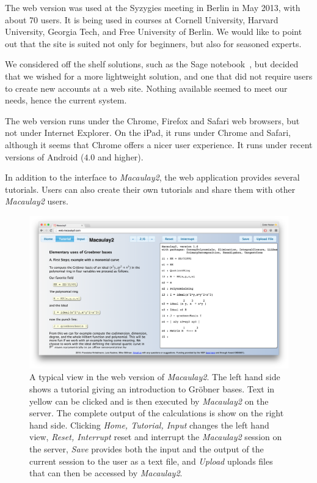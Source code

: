 \documentclass[twocolumn]{article}
\def\M2{{\it Macaulay2}}
\begin{document}
 The web version was used at the Syzygies
meeting in Berlin in May 2013, with about 70 users. It is being used in courses at Cornell
University, Harvard University, Georgia Tech, and Free University of
 Berlin. We would like to point out that the
site is suited not only for beginners, but also for seasoned experts.

We considered off the shelf solutions, such as the Sage
notebook~\cite{sagenotebook}, but decided that we wished for a more
lightweight solution, and one that did not require users to create
new accounts at a web site.  Nothing available seemed to meet our
needs, hence the current system.

The web version runs under the Chrome, Firefox and Safari web browsers, but not
under Internet Explorer.  On the iPad, it runs under Chrome and
Safari, although it seems that Chrome offers a nicer user experience.
It runs under recent versions of Android ($4.0$ and higher).

In addition to the interface to \M2, the web application provides several tutorials.  
Users can also create their own
tutorials and share them with other \M2 users.  

\begin{figure}[htb]
    \includegraphics[width=.99\textwidth]{homeWebsite.jpg}
    \caption{A typical view in the web version of \M2. The left hand
        side shows a tutorial giving an introduction to Gr\"obner
        bases. Text in yellow can be clicked and is then executed by
        \M2 on the server. The complete output of the calculations
        is show on the right hand side. Clicking {\it Home, Tutorial, Input}
        changes the left hand view, {\it Reset, Interrupt}
        reset and interrupt the \M2 session on the server, {\it
        Save} provides both the input and the output of the current
        session to the user as a text file, and {\it Upload} uploads files
        that can then be accessed by \M2.}
\label{fig:home}
\end{figure}
\end{document}
